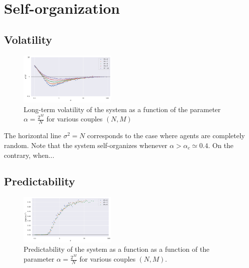 \documentclass[a4paper, amsfonts, amssymb, amsmath, reprint, showkeys, nofootinbib, twoside]{revtex4-1}
\begin{document}
\section{Self-organization}
\label{sec:self-organization}

\subsection{Volatility}

\begin{figure}[H]
    \centering
    \includegraphics[width=0.42\textwidth]{figures/volatility.png}
    \caption{Long-term volatility of the system as a function of the parameter $\alpha = \frac{2^M}{N}$ for various couples $(N, M)$}
    \label{fig:volatility}
\end{figure}    

The horizontal line $\sigma^2=N$ corresponds to the case where agents are completely random. Note that the system self-organizes whenever $\alpha > \alpha_c \simeq 0.4$. On the contrary, when...

\subsection{Predictability}

\begin{figure}[H]
    \centering
    \includegraphics[width=0.42\textwidth]{figures/predictability.png}
    \caption{Predictability of the system as a function as a function of the parameter $\alpha = \frac{2^M}{N}$ for various couples $(N, M)$.}
    \label{fig:predictability}
\end{figure}


\end{document}
